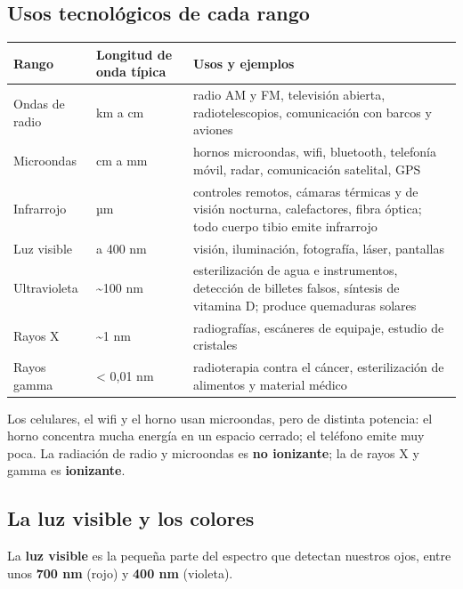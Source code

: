 \subsection{Usos tecnológicos de cada rango}
\begin{center}\small
\begin{tabularx}{\linewidth}{@{}>{\raggedright\arraybackslash\hsize=0.58\hsize}X>{\raggedright\arraybackslash\hsize=0.88\hsize}X>{\raggedright\arraybackslash\hsize=1.54\hsize}X@{}}
\toprule
\textbf{Rango} & \textbf{Longitud de onda típica} & \textbf{Usos y ejemplos} \\
\midrule
Ondas de radio & km a cm & radio AM y FM, televisión abierta, radiotelescopios, comunicación con barcos y aviones \\
Microondas & cm a mm & hornos microondas, wifi, bluetooth, telefonía móvil, radar, comunicación satelital, GPS \\
Infrarrojo & µm & controles remotos, cámaras térmicas y de visión nocturna, calefactores, fibra óptica; todo cuerpo tibio emite infrarrojo \\
Luz visible & 700 a 400 nm & visión, iluminación, fotografía, láser, pantallas \\
Ultravioleta & \textasciitilde{}100 nm & esterilización de agua e instrumentos, detección de billetes falsos, síntesis de vitamina D; produce quemaduras solares \\
Rayos X & \textasciitilde{}1 nm & radiografías, escáneres de equipaje, estudio de cristales \\
Rayos gamma & < 0,01 nm & radioterapia contra el cáncer, esterilización de alimentos y material médico \\
\bottomrule
\end{tabularx}
\end{center}
 
\begin{clave}[{Recuerda}] Los celulares, el wifi y el horno usan microondas, pero de distinta potencia: el horno concentra mucha energía en un espacio cerrado; el teléfono emite muy poca. La radiación de radio y microondas es \textbf{no ionizante}; la de rayos X y gamma es \textbf{ionizante}.\end{clave}
\subsection{La luz visible y los colores}
La \textbf{luz visible} es la pequeña parte del espectro que detectan nuestros ojos, entre unos \textbf{700 nm} (rojo) y \textbf{400 nm} (violeta).

